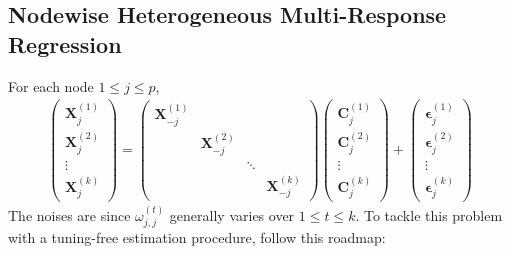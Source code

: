 \documentclass[twoside]{article}
\begin{document}
\subsection*{Nodewise Heterogeneous Multi-Response Regression}
For each node $1\leq j\leq p$, 
\begin{align*}
    \begin{pmatrix}
        \mathbf{X}_j^{(1)}\\
        \mathbf{X}_j^{(2)}\\
        \vdots\\
        \mathbf{X}_j^{(k)}
    \end{pmatrix} = \begin{pmatrix}
        \mathbf{X}_{-j}^{(1)} \\
        & \mathbf{X}_{-j}^{(2)} \\
        & & \ddots \\
        & & & \mathbf{X}_{-j}^{(k)}
    \end{pmatrix} \begin{pmatrix}
        \mathbf{C}_j^{(1)}\\
        \mathbf{C}_j^{(2)}\\
        \vdots\\
        \mathbf{C}_j^{(k)}
    \end{pmatrix}
    + \begin{pmatrix}
        \boldsymbol{\epsilon}_j^{(1)}\\
        \boldsymbol{\epsilon}_j^{(2)}\\
        \vdots\\
        \boldsymbol{\epsilon}_j^{(k)}
    \end{pmatrix}
\end{align*}
The noises are  since $\omega_{j,j}^{(t)}$ generally varies over $1\leq t\leq k$. To tackle this problem with a tuning-free estimation procedure, follow this roadmap:
\end{document}
